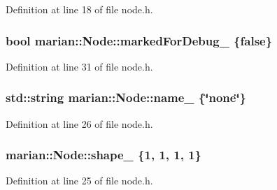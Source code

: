 Definition at line 18 of file node.\+h.

\subsubsection[{\texorpdfstring{marked\+For\+Debug\+\_\+}{markedForDebug_}}]{\setlength{\rightskip}{0pt plus 5cm}bool marian\+::\+Node\+::marked\+For\+Debug\+\_\+ \{false\}\hspace{0.3cm}{\ttfamily [protected]}}\hypertarget{classmarian_1_1Node_a666eca0dd7946a8438f71f0e14c0155c}{}\label{classmarian_1_1Node_a666eca0dd7946a8438f71f0e14c0155c}


Definition at line 31 of file node.\+h.

\subsubsection[{\texorpdfstring{name\+\_\+}{name_}}]{\setlength{\rightskip}{0pt plus 5cm}std\+::string marian\+::\+Node\+::name\+\_\+ \{\char`\"{}none\char`\"{}\}\hspace{0.3cm}{\ttfamily [protected]}}\hypertarget{classmarian_1_1Node_ad09fba82157b376108163b8575971d09}{}\label{classmarian_1_1Node_ad09fba82157b376108163b8575971d09}


Definition at line 26 of file node.\+h.

\subsubsection[{\texorpdfstring{shape\+\_\+}{shape_}}]{ marian\+::\+Node\+::shape\+\_\+ \{1, 1, 1, 1\}\hspace{0.3cm}{\ttfamily [protected]}}\hypertarget{classmarian_1_1Node_a54d7d94c76c2b943959a8e902a12b015}{}\label{classmarian_1_1Node_a54d7d94c76c2b943959a8e902a12b015}


Definition at line 25 of file node.\+h.

